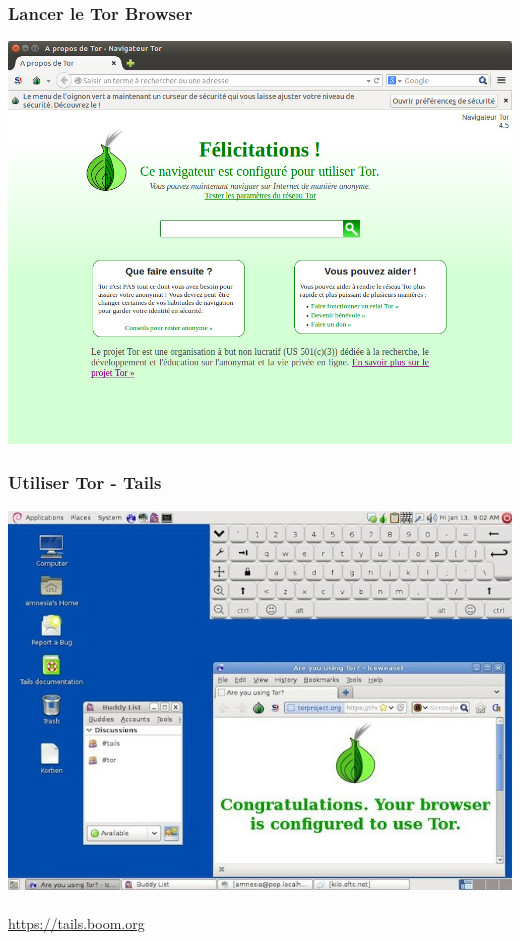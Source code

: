 \documentclass{beamer}
\begin{document}
\begin{frame}
\frametitle{Lancer le Tor Browser}
\begin{center}
\includegraphics[scale=0.3]{./images/tor_browser03.jpg}
\end{center}
\end{frame}

\begin{frame}
\frametitle{Utiliser Tor - Tails}
\begin{center}
\includegraphics[scale=0.3]{./images/tails.jpg}
\\~\\
\url{https://tails.boom.org}
\end{center}
\end{frame}
\end{document}

